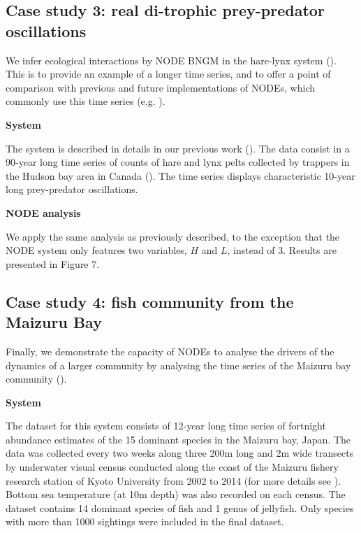 \documentclass[11pt, oneside]{article}
\begin{document}
\subsection{Case study 3: real di-trophic prey-predator oscillations}

We infer ecological interactions by NODE BNGM in the hare-lynx system (\cite{Odum1972}).
This is to provide an example of a longer time series, and to offer a point of comparison with previous and future implementations of NODEs, which commonly use this time series (e.g. \cite{Bonnaffe2021a,Frank2022}).

\textbf{System}

The system is described in details in our previous work (\cite{Bonnaffe2021a}).
The data consist in a 90-year long time series of counts of hare and lynx pelts collected by trappers in the Hudson bay area in Canada (\cite{Odum1972}).
The time series displays characteristic 10-year long prey-predator oscillations.

\textbf{NODE analysis}

We apply the same analysis as previously described, to the exception that the NODE system only features two variables, $H$ and $L$, instead of 3.
Results are presented in Figure 7.

\subsection{Case study 4: fish community from the Maizuru Bay}

Finally, we demonstrate the capacity of NODEs to analyse the drivers of the dynamics of a larger community by analysing the time series of the Maizuru bay community (\cite{Ushio2018}).

\textbf{System}

The dataset for this system consists of 12-year long time series of fortnight abundance estimates of the 15 dominant species in the Maizuru bay, Japan. 
The data was collected every two weeks along three 200m long and 2m wide transects by underwater visual census conducted along the coast of the Maizuru fishery research station of Kyoto University from 2002 to 2014 (for more details see \cite{Ushio2018}).
Bottom sea temperature (at 10m depth) was also recorded on each census.
The dataset contains 14 dominant species of fish and 1 genus of jellyfish.
Only species with more than 1000 sightings were included in the final dataset. 
\end{document}
